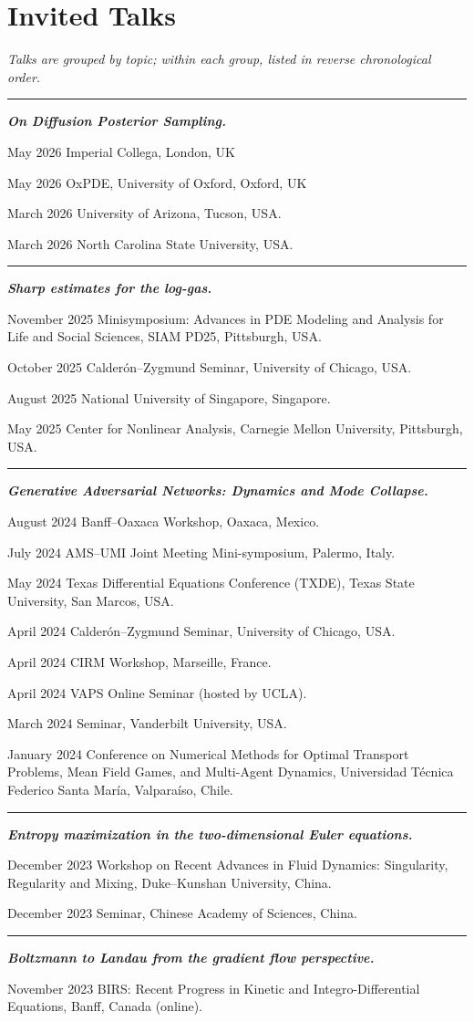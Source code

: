 \documentclass[11pt]{article}
\newcommand{\entry}[2]{%
  \par\addvspace{0.6ex}\noindent
  \begin{list}{}{%
    \setlength{\leftmargin}{1.5in}%
    \setlength{\labelwidth}{1.4in}%
    \setlength{\labelsep}{0.1in}%
  }%
  \item[\textsf{\small #1}] #2
  \end{list}
}
\newcommand{\talkgroup}[1]{%
  \par\addvspace{1.6ex}%
  \noindent\rule[0.4ex]{0.9em}{0.6pt}\enspace\textbf{\itshape #1}%
  \par\nopagebreak\addvspace{0.4ex}%
}
\begin{document}
\section{Invited Talks}

\noindent\textit{Talks are grouped by topic; within each group, listed in reverse chronological order.}\\[0.4em]

\talkgroup{On Diffusion Posterior Sampling.}
\entry{May 2026}{Imperial Collega, London, UK}
\entry{May 2026}{OxPDE, University of Oxford, Oxford, UK}
\entry{March 2026}{University of Arizona, Tucson, USA.}
\entry{March 2026}{North Carolina State University, USA.}

\talkgroup{Sharp estimates for the log-gas.}
\entry{November 2025}{Minisymposium: Advances in PDE Modeling and Analysis for Life and Social Sciences, SIAM PD25, Pittsburgh, USA.}
\entry{October 2025}{Calder\'on--Zygmund Seminar, University of Chicago, USA.}
\entry{August 2025}{National University of Singapore, Singapore.}
\entry{May 2025}{Center for Nonlinear Analysis, Carnegie Mellon University, Pittsburgh, USA.}

\talkgroup{Generative Adversarial Networks: Dynamics and Mode Collapse.}
\entry{August 2024}{Banff--Oaxaca Workshop, Oaxaca, Mexico.}
\entry{July 2024}{AMS--UMI Joint Meeting Mini-symposium, Palermo, Italy.}
\entry{May 2024}{Texas Differential Equations Conference (TXDE), Texas State University, San Marcos, USA.}
\entry{April 2024}{Calder\'on--Zygmund Seminar, University of Chicago, USA.}
\entry{April 2024}{CIRM Workshop, Marseille, France.}
\entry{April 2024}{VAPS Online Seminar (hosted by UCLA).}
\entry{March 2024}{Seminar, Vanderbilt University, USA.}
\entry{January 2024}{Conference on Numerical Methods for Optimal Transport Problems, Mean Field Games, and Multi-Agent Dynamics, Universidad T\'ecnica Federico Santa Mar\'ia, Valpara\'iso, Chile.}

\talkgroup{Entropy maximization in the two-dimensional Euler equations.}
\entry{December 2023}{Workshop on Recent Advances in Fluid Dynamics: Singularity, Regularity and Mixing, Duke--Kunshan University, China.}
\entry{December 2023}{Seminar, Chinese Academy of Sciences, China.}

\talkgroup{Boltzmann to Landau from the gradient flow perspective.}
\entry{November 2023}{BIRS: Recent Progress in Kinetic and Integro-Differential Equations, Banff, Canada (online).}
\end{document}
